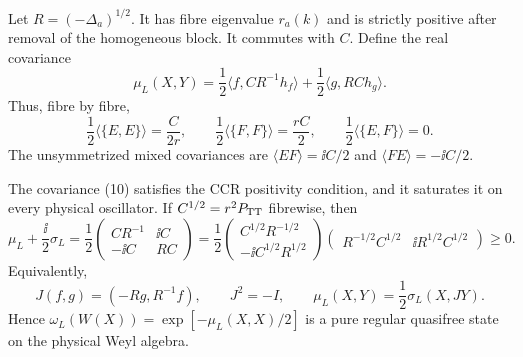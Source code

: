 Let $R=(-\Delta_a)^{1/2}$.  It has fibre eigenvalue $r_a(k)$ and is strictly
positive after removal of the homogeneous block.  It commutes with $C$.
Define the real covariance
\[
 \mu_L(X,Y)=\frac12\langle f,CR^{-1}h_f\rangle
            +\frac12\langle g,RC h_g\rangle.       \tag{10}
\]
Thus, fibre by fibre,
\[
 \frac12\langle\{E,E\}\rangle=\frac{C}{2r},\qquad
 \frac12\langle\{F,F\}\rangle=\frac{rC}{2},\qquad
 \frac12\langle\{E,F\}\rangle=0.                \tag{11}
\]
The unsymmetrized mixed covariances are $\langle EF\rangle=\ii C/2$ and
$\langle FE\rangle=-\ii C/2$.

\begin{theorem}
The covariance (10) satisfies the CCR positivity condition, and it saturates
it on every physical oscillator.  If $C^{1/2}=r^2P_{\mathrm{TT}}$ fibrewise, then
\[
 \mu_L+\frac{\ii}{2}\sigma_L
 =\frac12
 \begin{pmatrix}CR^{-1}&\ii C\\-\ii C&RC\end{pmatrix}
 =\frac12
 \begin{pmatrix}C^{1/2}R^{-1/2}\\-\ii C^{1/2}R^{1/2}\end{pmatrix}
 \begin{pmatrix}R^{-1/2}C^{1/2}&\ii R^{1/2}C^{1/2}\end{pmatrix}
 \ge0.                                               \tag{12}
\]
Equivalently,
\[
 J(f,g)=(-Rg,R^{-1}f),\qquad J^2=-I,\qquad
 \mu_L(X,Y)=\frac12\sigma_L(X,JY).                 \tag{13}
\]
Hence $\omega_L(W(X))=\exp[-\mu_L(X,X)/2]$ is a pure regular quasifree
state on the physical Weyl algebra.
\end{theorem}

